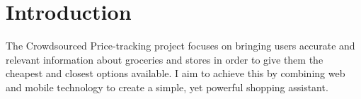 \section{Introduction}
The Crowdsourced Price-tracking project focuses on bringing users accurate and relevant information about groceries and stores in order to give them the cheapest and closest options available. I aim to achieve this by combining web and mobile technology to create a simple, yet powerful shopping assistant.

